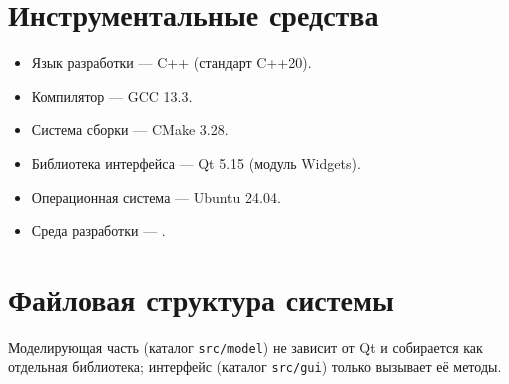 \documentclass[12pt,a4paper]{article}
\begin{document}
\section{Инструментальные средства}

\begin{itemize}
  \item Язык разработки --- C++ (стандарт C++20).
  \item Компилятор --- GCC 13.3.
  \item Система сборки --- CMake 3.28.
  \item Библиотека интерфейса --- Qt 5.15 (модуль Widgets).
  \item Операционная система --- Ubuntu 24.04.
  \item Среда разработки --- \underline{\hspace{4cm}}.
\end{itemize}

\section{Файловая структура системы}

Моделирующая часть (каталог \texttt{src/model}) не зависит от Qt и собирается
как отдельная библиотека; интерфейс (каталог \texttt{src/gui}) только вызывает
её методы.
\end{document}
